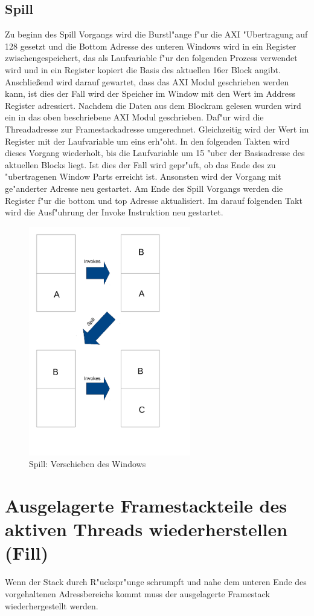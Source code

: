 \subsection{Spill}
Zu beginn des Spill Vorgangs wird die Burstl"ange f"ur die AXI "Ubertragung auf 128 gesetzt und die Bottom Adresse des unteren Windows wird in ein Register zwischengespeichert, das als Laufvariable f"ur den folgenden Prozess verwendet wird und in ein Register kopiert die Basis des aktuellen 16er Block angibt. 
Anschlie{\ss}end wird darauf gewartet, dass das AXI Modul geschrieben werden kann, ist dies der Fall wird der Speicher im Window mit den Wert im Address Register adressiert. 
Nachdem die Daten aus dem Blockram gelesen wurden wird ein in das oben beschriebene AXI Modul geschrieben. Daf"ur wird die Threadadresse zur Framestackadresse umgerechnet. Gleichzeitig wird der Wert im Register mit der Laufvariable um eins erh"oht.  In den folgenden Takten wird dieses Vorgang wiederholt, bis die Laufvariable um 15 "uber der Basisadresse des aktuellen Blocks liegt. Ist dies der Fall wird gepr"uft, ob das Ende des zu "ubertragenen Window Parts erreicht ist. Ansonsten wird der Vorgang mit ge"anderter Adresse neu gestartet. 
Am Ende des Spill Vorgangs werden die Register f"ur die bottom und top Adresse aktualisiert. Im darauf folgenden Takt wird die Ausf"uhrung der Invoke Instruktion neu gestartet.
\begin{figure}
	\centering
	\includegraphics[height = 10cm]{PS_RS_graphics/spill.pdf}
	\caption{Spill: Verschieben des Windows }
\end{figure}

\section{Ausgelagerte Framestackteile des aktiven Threads wiederherstellen (Fill)}
Wenn der Stack durch R"uckspr"unge schrumpft und nahe dem unteren Ende des vorgehaltenen Adressbereichs kommt muss der ausgelagerte Framestack wiederhergestellt werden. 

